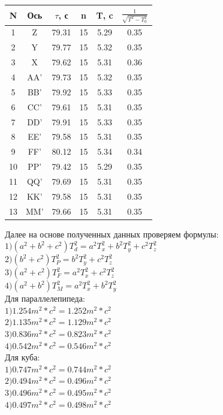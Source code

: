 \documentclass[12pt, a4paper]{article}
\begin{document}
					
		\begin{center}
            \begin{tabular}{ | c | c | c | c | c | c | }
                \hline
                N & Ось & $\tau$, с & n & T, c & $\frac{1}{\sqrt{T^2-T_0^2}}$ \\ \hline
                1 & Z & 79.31 & 15 & 5.29 & 0.35 \\ \hline
                2 & Y & 79.77 & 15 & 5.32 & 0.35 \\ \hline
				3 & X & 79.62 & 15 & 5.31 & 0.36 \\\hline
				4 & AA' & 79.73 & 15 & 5.32 & 0.35 \\ \hline
				5 & BB' & 79.92 & 15 & 5.33 & 0.35 \\ \hline
				6 & CC' & 79.61 & 15 & 5.31 & 0.35 \\ \hline
				7 & DD' & 79.91 & 15 & 5.33 & 0.35 \\\hline
				8 & EE' & 79.58 & 15 & 5.31 & 0.35 \\\hline
				9 & FF' & 80.12 & 15 & 5.34 & 0.34 \\\hline
				10 & PP' & 79.42 & 15 & 5.29 & 0.35 \\\hline
				11 & QQ' & 79.69 & 15 & 5.31 & 0.35 \\\hline
				12 & KK' & 79.58 & 15 & 5.31 & 0.35 \\\hline
				13 & MM' & 79.66 & 15 & 5.31 & 0.35 \\\hline
            \end{tabular}
            \end{center}


			Далее на основе полученных данных проверяем формулы: \\
			$1) (a^2 + b^2 + c^2)T_d^2 = a^2T_x^2 + b^2T_y^2 + c^2T_z^2$ \\
			$2) (b^2 + c^2)T_P^2 = b^2T_y^2 + c^2T_z^2$ \\
			$3) (a^2 + c^2)T_F^2 = a^2T_x^2 + c^2T_z^2$ \\
			$4) (a^2 + b^2)T_M^2 = a^2T_x^2 + b^2T_y^2$ \\


			Для параллелепипеда: \\
			$1) 1.254 m^2*c^2 = 1.252 m^2*c^2$ \\
			$2) 1.135 m^2*c^2 = 1.129 m^2*c^2$ \\
			$3) 0.836 m^2*c^2 = 0.823 m^2*c^2$ \\
			$4) 0.542 m^2*c^2 = 0.546 m^2*c^2$ \\
			Для куба: \\
			$1) 0.747 m^2*c^2 = 0.744 m^2*c^2$ \\
			$2) 0.494 m^2*c^2 = 0.496 m^2*c^2$ \\
			$3) 0.496 m^2*c^2 = 0.495 m^2*c^2$ \\
			$4) 0.497 m^2*c^2 = 0.498 m^2*c^2$ \\
\end{document}
